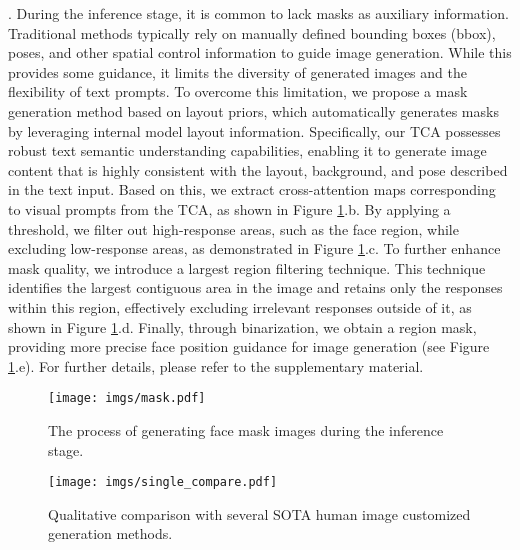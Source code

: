 . During the inference stage, it is common to lack masks as auxiliary information. Traditional methods \cite{gu2024mix,wang2024instantid} typically rely on manually defined bounding boxes (bbox), poses, and other spatial control information to guide image generation. While this provides some guidance, it limits the diversity of generated images and the flexibility of text prompts. To overcome this limitation, we propose a mask generation method based on layout priors, which automatically generates masks by leveraging internal model layout information. Specifically, our TCA possesses robust text semantic understanding capabilities, enabling it to generate image content that is highly consistent with the layout, background, and pose described in the text input. Based on this, we extract cross-attention maps corresponding to visual prompts from the TCA, as shown in Figure \ref{fig:inference_mask}.b. By applying a threshold, we filter out high-response areas, such as the face region, while excluding low-response areas, as demonstrated in Figure \ref{fig:inference_mask}.c. To further enhance mask quality, we introduce a largest region filtering technique. This technique identifies the largest contiguous area in the image and retains only the responses within this region, effectively excluding irrelevant responses outside of it, as shown in Figure \ref{fig:inference_mask}.d. Finally, through binarization, we obtain a region mask, providing more precise face position guidance for image generation (see Figure \ref{fig:inference_mask}.e). For further details, please refer to the supplementary material.


\begin{figure}[t]
    \centering
    \texttt{[image: imgs/mask.pdf]} %
    \caption{The process of generating face mask images during the inference stage.} %
    \label{fig:inference_mask} %
\end{figure}



\begin{figure*}[t]
    \centering
    \texttt{[image: imgs/single\_compare.pdf]}
    \caption{Qualitative comparison with several SOTA human image customized generation methods.}
    \label{fig:single_compare}
\end{figure*}